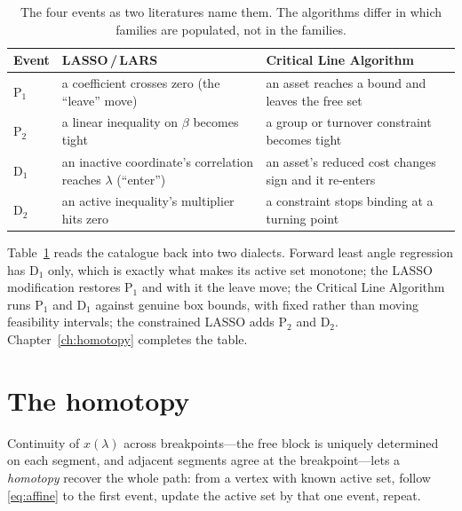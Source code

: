 \begin{table}[ht]
\centering
\footnotesize
\caption{The four events as two literatures name them. The algorithms differ in
which families are populated, not in the families.}
\label{tab:events}
\begin{tabular}{@{}lll@{}}
\toprule
Event & LASSO\,/\,LARS & Critical Line Algorithm \\
\midrule
$\mathrm{P}_1$ & a coefficient crosses zero (the ``leave'' move)
               & an asset reaches a bound and leaves the free set \\
$\mathrm{P}_2$ & a linear inequality on $\beta$ becomes tight
               & a group or turnover constraint becomes tight \\
$\mathrm{D}_1$ & an inactive coordinate's correlation reaches $\lambda$ (``enter'')
               & an asset's reduced cost changes sign and it re-enters \\
$\mathrm{D}_2$ & an active inequality's multiplier hits zero
               & a constraint stops binding at a turning point \\
\bottomrule
\end{tabular}
\end{table}

Table~\ref{tab:events} reads the catalogue back into two dialects. Forward least
angle regression has $\mathrm{D}_1$ only, which is exactly what makes its active set
monotone; the LASSO modification restores $\mathrm{P}_1$ and with it the leave move;
the Critical Line Algorithm runs $\mathrm{P}_1$ and $\mathrm{D}_1$ against genuine
box bounds, with fixed rather than moving feasibility intervals; the constrained
LASSO adds $\mathrm{P}_2$ and $\mathrm{D}_2$. Chapter~\ref{ch:homotopy} completes
the table.

\section{The homotopy}

Continuity of $x(\lambda)$ across breakpoints---the free block is uniquely
determined on each segment, and adjacent segments agree at the breakpoint---lets a
\emph{homotopy} recover the whole path: from a vertex with known active set, follow
\eqref{eq:affine} to the first event, update the active set by that one event,
repeat.

